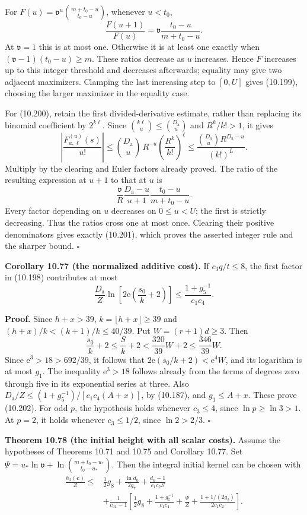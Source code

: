 \documentclass[
  11pt,
  a4paper,
]{article}
\begin{document}
For \(F(u)=\mathfrak v^u\binom{m+t_0-u}{t_0-u}\), whenever \(u<t_0\), \[
\frac{F(u+1)}{F(u)}
=\mathfrak v\frac{t_0-u}{m+t_0-u}.
\] At \(\mathfrak v=1\) this is at most one. Otherwise it is at least
one exactly when \((\mathfrak v-1)(t_0-u)\ge m\). These ratios decrease
as \(u\) increases. Hence \(F\) increases up to this integer threshold
and decreases afterwards; equality may give two adjacent maximizers.
Clamping the last increasing step to \([0,U]\) gives (10.199), choosing
the larger maximizer in the equality case.

For (10.200), retain the first divided-derivative estimate, rather than
replacing its binomial coefficient by \(2^{k\ell}\). Since
\(\binom{k\ell}{u}\le\binom{D_{\mathrm a}}u\) and \(R^k/k!>1\), it gives
\[
\left|\frac{F_{a,\ell}^{(u)}(s)}{u!}\right|
\le \binom{D_{\mathrm a}}u\,R^{-u}
\left(\frac{R^k}{k!}\right)^\ell
\le\frac{\binom{D_{\mathrm a}}u R^{D_{\mathrm a}-u}}{(k!)^L}.
\] Multiply by the clearing and Euler factors already proved. The ratio
of the resulting expression at \(u+1\) to that at \(u\) is \[
\frac{\mathfrak v}{R}\frac{D_{\mathrm a}-u}{u+1}
\frac{t_0-u}{m+t_0-u}.
\] Every factor depending on \(u\) decreases on \(0\le u<U\); the first
is strictly decreasing. Thus the ratios cross one at most once. Clearing
their positive denominators gives exactly (10.201), which proves the
asserted integer rule and the sharper bound. \(\square\)

\textbf{Corollary 10.77 (the normalized additive cost).} If
\(c_3q/t\le8\), the first factor in (10.198) contributes at most \[
\frac{D_{\mathrm a}}Z
\ln\left[2\mathrm e\left(\frac{s_0}{k}+2\right)\right]
\le\frac{1+g_5^{-1}}{c_1c_4}.
\tag{10.202}
\]

\textbf{Proof.} Since \(h+x>39\), \(k=\lfloor h+x\rfloor\ge39\) and
\((h+x)/k<(k+1)/k\le40/39\). Put \(W=(r+1)d\ge3\). Then \[
\frac{s_0}{k}+2\le\frac Sk+2
<\frac{320}{39}W+2\le\frac{346}{39}W.
\] Since \(\mathrm e^3>18>692/39\), it follows that
\(2\mathrm e(s_0/k+2)<\mathrm e^4W\), and its logarithm is at most
\(g_1\). The inequality \(\mathrm e^3>18\) follows already from the
terms of degrees zero through five in its exponential series at three.
Also \(D_{\mathrm a}/Z\le(1+g_5^{-1})/[c_1c_4(A+x)]\), by (10.187), and
\(g_1\le A+x\). These prove (10.202). For odd \(p\), the hypothesis
holds whenever \(c_3\le4\), since \(\ln p\ge\ln3>1\). At \(p=2\), it
holds whenever \(c_3\le1/2\), since \(\ln2>2/3\). \(\square\)

\textbf{Theorem 10.78 (the initial height with all scalar costs).}
Assume the hypotheses of Theorems 10.71 and 10.75 and Corollary 10.77.
Set \(\Psi=u_*\ln\mathfrak v+\ln\binom{m+t_0-u_*}{t_0-u_*}\). Then the
integral initial kernel can be chosen with \[
\begin{aligned}
\frac{h_2(\boldsymbol c)}Z\le{}&
\frac12g_8+\frac{\ln d_0}{2g_7}
+\frac{d_0-1}{c_1c_2S}\\
&+\frac1{c_{01}-1}
\left[\frac12g_8+\frac{1+g_5^{-1}}{c_1c_4}
+\frac{\Psi}{Z}
+\frac{1+1/(2g_2)}{2c_1c_2}\right].
\end{aligned}
\tag{10.203}
\]
\end{document}
